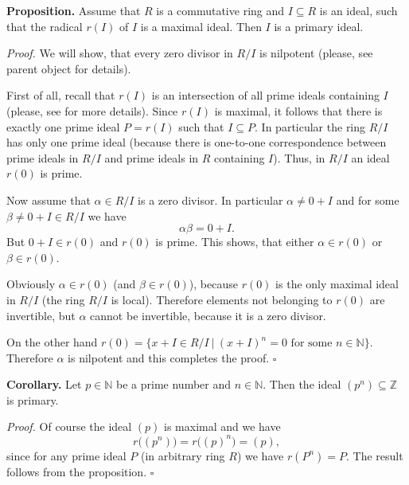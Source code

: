 \documentclass[12pt]{article}
\begin{document}
\textbf{Proposition.} Assume that $R$ is a commutative ring and $I\subseteq R$ is an ideal, such that the radical $r(I)$ of $I$ is a maximal ideal. Then $I$ is a primary ideal.

\textit{Proof.} We will show, that every zero divisor in $R/I$ is nilpotent (please, see parent object for details).

First of all, recall that $r(I)$ is an intersection of all prime ideals containing $I$ (please, see  for more details). Since $r(I)$ is maximal, it follows that there is exactly one prime ideal $P=r(I)$ such that $I\subseteq P$. In particular the ring $R/I$ has only one prime ideal (because there is one-to-one correspondence between prime ideals in $R/I$ and prime ideals in $R$ containing $I$). Thus, in $R/I$ an ideal $r(0)$ is prime.

Now assume that $\alpha\in R/I$ is a zero divisor. In particular $\alpha\neq 0+I$ and for some $\beta\neq 0+I \in R/I$ we have
$$\alpha\beta=0+I.$$
But $0+I\in r(0)$ and $r(0)$ is prime. This shows, that either $\alpha\in r(0)$ or $\beta\in r(0)$.

Obviously $\alpha\in r(0)$ (and $\beta\in r(0)$), because $r(0)$ is the only maximal ideal in $R/I$ (the ring $R/I$ is local). Therefore elements not belonging to $r(0)$ are invertible, but $\alpha$ cannot be invertible, because it is a zero divisor.

On the other hand $r(0)=\{x+I\in R/I\ |\ (x+I)^n=0\mbox{ for some }n\in\mathbb{N}\}$. Therefore $\alpha$ is nilpotent and this completes the proof. $\square$

\textbf{Corollary.} Let $p\in\mathbb{N}$ be a prime number and $n\in\mathbb{N}$. Then the ideal $(p^n)\subseteq\mathbb{Z}$ is primary.

\textit{Proof.} Of course the ideal $(p)$ is maximal and we have 
$$r\big((p^n)\big)=r\big((p)^n\big)=(p),$$
since for any prime ideal $P$ (in arbitrary ring $R$) we have $r(P^n)=P$. The result follows from the proposition. $\square$
\end{document}
